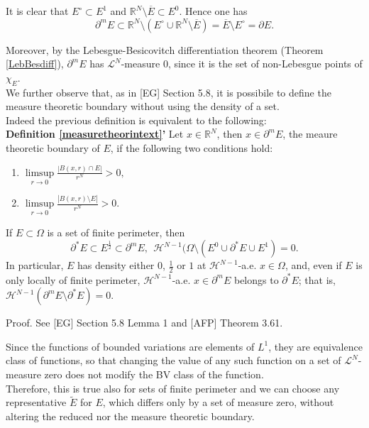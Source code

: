 \begin{remark} \label{essboundnull} It is clear that $E^{\circ} \subset E^{1}$ and $\mathbb{R}^{N} \setminus \overline E \subset E^{0}$. Hence one has 
\[ \partial^{m}E \subset \mathbb{R}^{N} \setminus (E^{\circ} \cup \mathbb{R}^{N} \setminus \overline E) = \overline E \setminus E^{\circ} = \partial E. \]

Moreover, by the Lebesgue-Besicovitch differentiation theorem (Theorem \ref{LebBesdiff}), $\partial^{m} E$ has $\mathcal{L}^{N}$-measure $0$, since it is the set of non-Lebesgue points of $\chi_{E}$.
\\

We further observe that, as in [EG] Section 5.8, it is possibile to define the measure theoretic boundary without using the density of a set.
\\
Indeed the previous definition is equivalent to the following:
\\

\textbf{Definition \ref{measuretheorintext}'} Let $x \in \mathbb{R}^{N}$, then $x \in \partial^{m}E$, the meaure theoretic boundary of $E$, if the following two conditions hold:
\begin{enumerate}
	\item $\displaystyle \limsup\limits_{r \to 0} \frac{|B(x,r) \cap E|}{r^{N}} > 0,$
	\item $\displaystyle \limsup\limits_{r \to 0} \frac{|B(x,r) \setminus E|}{r^{N}} > 0.$
\end{enumerate}
\end{remark}

\begin{theorem} \label{structhm2} If $E \subset \Omega$ is a set of finite perimeter, then
\[ \partial^{*}E \subset E^{\frac{1}{2}} \subset \partial^{m}E, \  \ \mathcal{H}^{N-1}(\Omega \setminus (E^{0} \cup \partial^{*}E \cup E^{1}) = 0. \]
In particular, $E$ has density either $0$, $\frac{1}{2}$ or $1$ at $\mathcal{H}^{N-1}$-a.e. $x \in \Omega$, and, even if $E$ is only locally of finite perimeter, $\mathcal{H}^{N-1}$-a.e. $x \in \partial^{m}E$ belongs to $\partial^{*}E$; that is, $\mathcal{H}^{N-1}(\partial^{m}E \setminus \partial^{*}E) = 0$.
\end{theorem}
Proof. See [EG] Section 5.8 Lemma 1 and [AFP] Theorem 3.61.


\begin{remark} \label{setrepr} Since the functions of bounded variations are elements of $L^{1}$, they are equivalence class of functions, so that changing the value of any such function on a set of $\mathcal{L}^{N}$-measure zero does not modify the BV class of the function.
\\
Therefore, this is true also for sets of finite perimeter and we can choose any representative $\widetilde{E}$ for $E$, which differs only by a set of measure zero, without altering the reduced nor the measure theoretic boundary.
\end{remark}


